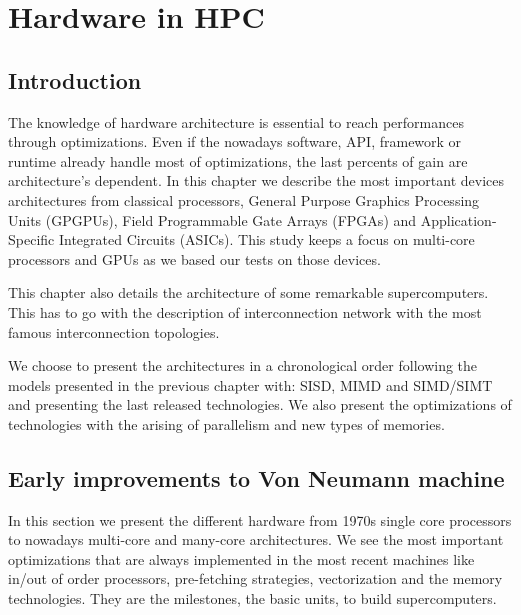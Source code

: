 
\chapter{Hardware in HPC}

\section{Introduction}

The knowledge of hardware architecture is essential to reach performances through optimizations.
Even if the nowadays software, API, framework or runtime already handle most of optimizations, the last percents of gain are architecture's dependent. 
In this chapter we describe the most important devices architectures from classical processors, General Purpose Graphics Processing Units (GPGPUs), Field Programmable Gate Arrays (FPGAs) and Application-Specific Integrated Circuits (ASICs).
This study keeps a focus on multi-core processors and GPUs as we based our tests on those devices. 

This chapter also details the architecture of some remarkable supercomputers. 
This has to go with the description of interconnection network with the most famous interconnection topologies. 

We choose to present the architectures in a chronological order following the models presented in the previous chapter with: SISD, MIMD and SIMD/SIMT and presenting the last released technologies.
We also present the optimizations of technologies with the arising of parallelism and new types of memories.

\section{Early improvements to Von Neumann machine}
In this section we present the different hardware from 1970s single core processors to nowadays multi-core and many-core architectures. 
We see the most important optimizations that are always implemented in the most recent machines like in/out of order processors, pre-fetching strategies, vectorization and the memory technologies. 
They are the milestones, the basic units, to build supercomputers. 

